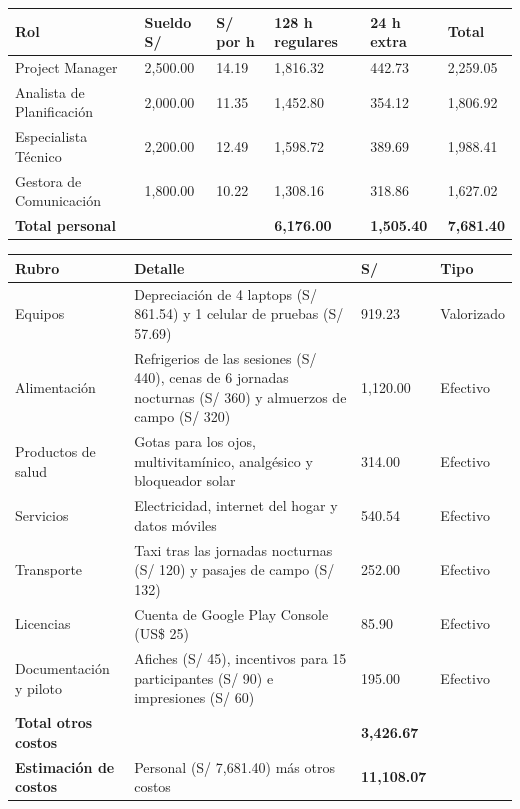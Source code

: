 \documentclass[11pt,a4paper]{article}
\begin{document}
\vspace{0.1cm}
{\small
{}
\noindent\begin{tabularx}{\textwidth}{@{}L Q{1.6cm} Q{1.2cm} Q{2.2cm} Q{2.2cm} Q{1.8cm}@{}}
\toprule
{}
\textbf{Rol} & \textbf{Sueldo S/} & \textbf{S/ por h} & \textbf{128 h regulares} & \textbf{24 h extra} & \textbf{Total} \\
\midrule
Project Manager & 2,500.00 & 14.19 & 1,816.32 & 442.73 & 2,259.05 \\
Analista de Planificación & 2,000.00 & 11.35 & 1,452.80 & 354.12 & 1,806.92 \\
Especialista Técnico & 2,200.00 & 12.49 & 1,598.72 & 389.69 & 1,988.41 \\
Gestora de Comunicación & 1,800.00 & 10.22 & 1,308.16 & 318.86 & 1,627.02 \\
\midrule
{}\textbf{Total personal} & & & \textbf{6,176.00} & \textbf{1,505.40} & \textbf{7,681.40} \\
\bottomrule
\end{tabularx}
}

\vspace{0.15cm}
{\small
{}
\noindent\begin{tabularx}{\textwidth}{@{}P{3.3cm} L Q{1.8cm} C{1.7cm}@{}}
\toprule
{}
\textbf{Rubro} & \textbf{Detalle} & \textbf{S/} & \textbf{Tipo} \\
\midrule
Equipos & Depreciación de 4 laptops (S/ 861.54) y 1 celular de pruebas (S/ 57.69) & 919.23 & Valorizado \\
Alimentación & Refrigerios de las sesiones (S/ 440), cenas de 6 jornadas nocturnas (S/ 360) y almuerzos de campo (S/ 320) & 1,120.00 & Efectivo \\
Productos de salud & Gotas para los ojos, multivitamínico, analgésico y bloqueador solar & 314.00 & Efectivo \\
Servicios & Electricidad, internet del hogar y datos móviles & 540.54 & Efectivo \\
Transporte & Taxi tras las jornadas nocturnas (S/ 120) y pasajes de campo (S/ 132) & 252.00 & Efectivo \\
Licencias & Cuenta de Google Play Console (US\$ 25) & 85.90 & Efectivo \\
Documentación y piloto & Afiches (S/ 45), incentivos para 15 participantes (S/ 90) e impresiones (S/ 60) & 195.00 & Efectivo \\
\midrule
{}\textbf{Total otros costos} & & \textbf{3,426.67} & \\
\textbf{Estimación de costos} & Personal (S/ 7,681.40) más otros costos & \textbf{11,108.07} & \\
\bottomrule
\end{tabularx}
}
\end{document}
